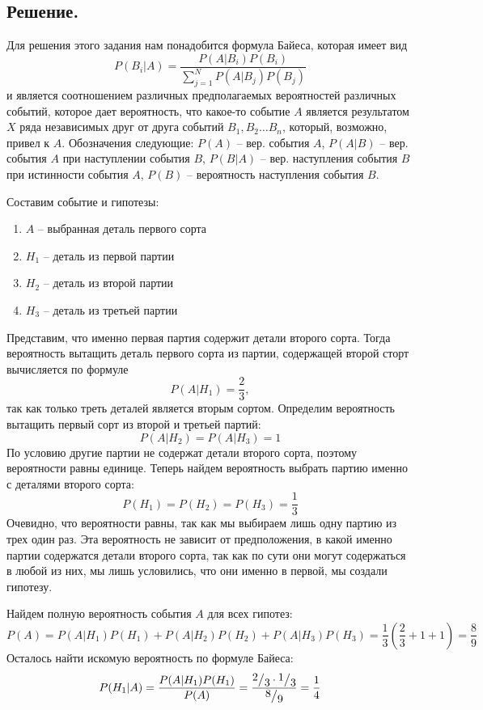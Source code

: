 \documentclass[a4paper, 12pt]{article}
\newcommand{\frc}[2]{\raisebox{2pt}{$#1$}\big/\raisebox{-3pt}{$#2$}}
\begin{document}
    \subsection{Решение.}
    Для решения этого задания нам понадобится формула Байеса, которая имеет вид
    $$P\left(B_i | A\right)=\dfrac{P\left(A | B_i\right)P\left(B_i\right)}{\sum\limits_{j=1}^{N}P\left(A|B_{j}\right)P\left(B_j\right)}$$ и является
    соотношением различных предполагаемых вероятностей различных событий, которое дает вероятность, что какое-то
    событие $A$ является результатом $X$ ряда независимых друг от друга событий $B_1,B_2\hdots B_n$, который,
    возможно, привел к $A$. Обозначения следующие: $P\left(A\right)$ -- вер. события $A$, $P\left(A|B\right)$ -- вер. события $A$ при
    наступлении события $B$, $P\left(B|A\right)$ -- вер. наступления события $B$ при истинности события $A$, $P\left(B\right)$ --
    вероятность наступления события $B$.


    Составим событие и гипотезы:
    \begin{enumerate}
        \item $A$ -- выбранная деталь первого сорта
        \item $H_1$ -- деталь из первой партии
        \item $H_2$ -- деталь из второй партии
        \item $H_3$ -- деталь из третьей партии
    \end{enumerate}


    Представим, что именно первая партия содержит детали второго сорта. Тогда вероятность вытащить деталь первого сорта из
    партии, содержащей второй сторт вычисляется по формуле $$P\left(A|H_1\right)=\dfrac{2}{3},$$ так как только треть деталей
    является вторым сортом. Определим вероятность вытащить первый сорт из второй и третьей партий:
    $$
    P\left(A|H_2\right)=P\left(A|H_3\right)=1
    $$
    По условию другие партии не содержат детали второго сорта, поэтому вероятности равны единице. Теперь найдем вероятность
    выбрать партию именно с деталями второго сорта:
    $$
    P(H_1)=P(H_2)=P(H_3)=\dfrac{1}{3}
    $$
    Очевидно, что вероятности равны, так как мы выбираем лишь одну партию из трех один раз. Эта вероятность не зависит от предположения,
    в какой именно партии содержатся детали второго сорта, так как по сути они могут содержаться в любой из них, мы лишь условились, что
    они именно в первой, мы создали гипотезу.


    Найдем полную вероятность события $A$ для всех гипотез:
    $$
    P(A)=P(A|H_1)P(H_1)+P(A|H_2)P(H_2)+P(A|H_3)P(H_3)=\dfrac{1}{3}\left(\dfrac{2}{3}+1+1\right)=\dfrac{8}{9}
    $$
    Осталось найти искомую вероятность по формуле Байеса:
    $$
    P(H_1|A)=\dfrac{P(A|H_1)P(H_1)}{P(A)}=\dfrac{\frc{2}{3}\cdot\frc{1}{3}}{\frc{8}{9}}=\dfrac{1}{4}
    $$
\end{document}

